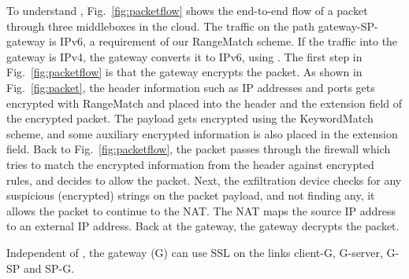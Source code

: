 To understand \sys, Fig.~\ref{fig:packetflow} shows the end-to-end flow of a packet through three middleboxes in the cloud. The traffic on the path gateway-SP-gateway is IPv6, a requirement of our RangeMatch scheme. If the traffic into the gateway is IPv4, the gateway converts it to IPv6, using . The first step in Fig.~\ref{fig:packetflow} is that the gateway encrypts the packet. As shown in Fig.~\ref{fig:packet}, the header information such as IP addresses and ports gets encrypted with RangeMatch and placed into the header and the extension field of the encrypted packet. The payload gets encrypted using the KeywordMatch scheme, and some auxiliary encrypted information is also placed in the extension field. Back to Fig.~\ref{fig:packetflow}, the packet passes through the firewall which tries to match the encrypted information from the header against  encrypted rules, and decides to allow the packet. Next, the exfiltration device checks for any suspicious (encrypted) strings on the packet payload, and not finding any, it allows the packet  to continue to the NAT. The NAT maps the source IP address to an external IP address. Back at the gateway, the gateway decrypts the packet. 

Independent of \sys, the gateway (G) can use SSL on the links client-G,  G-server, G-SP and SP-G. 





